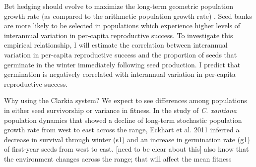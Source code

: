 \documentclass[12pt, oneside, titlepage]{article}   	%
\begin{document}
Bet hedging should evolve to maximize the long-term geometric population growth rate (as compared to the arithmetic population growth rate) \cite{cohen1966,cohen1968,ellner1985,ellner1985a}. Seed banks are more likely to be selected in populations which experience higher levels of interannual variation in per-capita reproductive success. To investigate this empirical relationship, I will estimate the correlation between interannual variation in per-capita reproductive success and the proportion of seeds that germinate in the winter immediately following seed production. I predict that germination is negatively correlated with interannual variation in per-capita reproductive success. %

Why using the Clarkia system? We expect to see differences among populations in either seed survivorship or variance in fitness. In the study of \textit{C. xantiana} population dynamics that showed a decline of long-term stochastic population growth rate from west to east across the range, Eckhart et al. 2011 inferred a decrease in survival through winter (s1) and an increase in germination rate (g1) of first-year seeds from west to east. [need to be clear about this] also know that the environment changes across the range; that will affect the mean fitness

\end{document}
